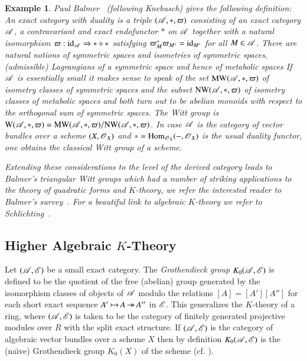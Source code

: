 \documentclass[1p]{elsarticle}
\theoremstyle{mythm}
\theoremstyle{mydef}
\newtheorem{Exm}[Thm]{Example}
\begin{document}
\begin{Exm}
  Paul Balmer~\cite{MR2181829} (following Knebusch) 
  gives the following definition:
  An \emph{exact category with duality} is a triple
  $(\operatorname{\mathscr{A}},\ast,\varpi)$ consisting of an exact category $\operatorname{\mathscr{A}}$, a
  contravariant and exact endofunctor $\ast$ on $\operatorname{\mathscr{A}}$ together with 
  a natural isomorphism $\varpi: \operatorname{id}_{\operatorname{\mathscr{A}}} \Rightarrow \ast \circ
  \ast$ satisfying $\varpi_{M}^{\ast} \varpi_{M^{\ast}} =
  \operatorname{id}_{M^{\ast}}$ for all $M \in \operatorname{\mathscr{A}}$.
  There are natural notions of symmetric spaces and isometries of
  symmetric spaces, (admissible) Lagrangians of a symmetric space and
  hence of metabolic spaces
  If $\operatorname{\mathscr{A}}$ is
  essentially small it makes sense to speak of the set 
  ${\rm MW}(\operatorname{\mathscr{A}}, \ast, \varpi)$ of isometry classes of
  symmetric spaces and the subset ${\rm NW}{(\operatorname{\mathscr{A}},\ast,\varpi)}$ 
  of isometry classes of metabolic spaces and both turn out to be
  abelian monoids with respect to the \emph{orthogonal sum} of
  symmetric spaces. The \emph{Witt group} is
  ${\rm W}{(\operatorname{\mathscr{A}}, \ast, \varpi)} =
  {\rm MW}{(\operatorname{\mathscr{A}},\ast,\varpi)}/{\rm NW}{(\operatorname{\mathscr{A}},\ast,\varpi)}$.
  In case $\operatorname{\mathscr{A}}$ is the category
  of vector bundles over a scheme $(X, \operatorname{\mathscr{O}}_{X})$ and $\ast =
  \operatorname{Hom}_{\operatorname{\mathscr{O}}_{X}}({-}, \operatorname{\mathscr{O}}_{X})$ is the usual duality functor, one
  obtains the classical Witt group of a scheme.

  Extending these considerations to the level of the derived category 
  leads to \emph{Balmer's triangular Witt groups}
  which had a number of striking applications to the theory of
  quadratic forms and $K$-theory, we refer the interested reader to
  Balmer's survey~\cite{MR2181829}. For
  a beautiful link to algebraic $K$-theory we refer to
  Schlichting~\cite{schlichting}. 
\end{Exm}

\subsection{Higher Algebraic $K$-Theory}

Let $(\operatorname{\mathscr{A}},\operatorname{\mathscr{E}})$ be a small exact category.
The \emph{Grothendieck group} $K_{0}(\operatorname{\mathscr{A}},\operatorname{\mathscr{E}})$
is defined to be the quotient of the free (abelian) group
generated by the isomorphism classes of objects of $\operatorname{\mathscr{A}}$ modulo the
relations $[A] = [A'][A'']$ for each short exact sequence
$A' \operatorname{\rightarrowtail} A \operatorname{\twoheadrightarrow} A''$ in $\operatorname{\mathscr{E}}$. This generalizes the $K$-theory of a
ring, where $(\operatorname{\mathscr{A}},\operatorname{\mathscr{E}})$ is taken to be the category of finitely
generated projective modules over $R$ with the split exact
structure. If $(\operatorname{\mathscr{A}},\operatorname{\mathscr{E}})$ is the category of algebraic vector
bundles over a scheme $X$ then by definition
$K_{0}{(\operatorname{\mathscr{A}},\operatorname{\mathscr{E}})}$ is the (na\"\i{}ve) Grothendieck group 
$K_{0}{(X)}$ of the scheme (cf. \cite[3.2, p.~313]{MR1106918}).
\end{document}
